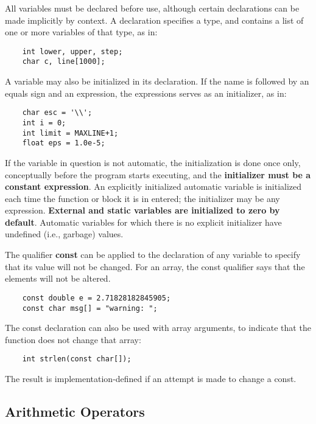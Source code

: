 \documentclass{article}
\begin{document}
All variables must be declared before use, although certain declarations can be made implicitly by context. A declaration specifies a type, and contains a list of one or more variables of that type, as in:

\begin{lstlisting}
	int lower, upper, step;
	char c, line[1000];
\end{lstlisting}

A variable may also be initialized in its declaration. If the name is followed by an equals sign and an expression, the expressions serves as an initializer, as in:

\begin{lstlisting}
	char esc = '\\';
	int i = 0;
	int limit = MAXLINE+1;
	float eps = 1.0e-5;
\end{lstlisting}

If the variable in question is not automatic, the initialization is done once only, conceptually before the program starts executing, and the \textbf{initializer must be a constant expression}. An explicitly initialized automatic variable is initialized each time the function or block it is in entered; the initializer may be any expression. \textbf{External and static variables are initialized to zero by default}. Automatic variables for which there is no explicit initializer have undefined (i.e., garbage) values. 

The qualifier \textbf{const} can be applied to the declaration of any variable to specify that its value will not be changed. For an array, the const qualifier says that the elements will not be altered. 

\begin{lstlisting}
	const double e = 2.71828182845905;
	const char msg[] = "warning: ";
\end{lstlisting}

The const declaration can also be used with array arguments, to indicate that the function does not change that array:

\begin{lstlisting}
	int strlen(const char[]);
\end{lstlisting}

The result is implementation-defined if an attempt is made to change a const.

\subsection{Arithmetic Operators}
\end{document}

